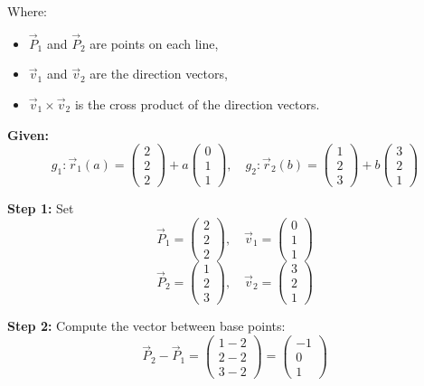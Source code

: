 Where:
\begin{itemize}
	\item $\vec{P}_1$ and $\vec{P}_2$ are points on each line,
	\item $\vec{v}_1$ and $\vec{v}_2$ are the direction vectors,
	\item $\vec{v}_1 \times \vec{v}_2$ is the cross product of the direction vectors.
\end{itemize}

\textbf{Given:}
\[
	g_1: \vec{r}_1(a) = \begin{pmatrix} 2 \\ 2 \\ 2 \end{pmatrix} + a \begin{pmatrix} 0 \\ 1 \\ 1 \end{pmatrix}, \quad
	g_2: \vec{r}_2(b) = \begin{pmatrix} 1 \\ 2 \\ 3 \end{pmatrix} + b \begin{pmatrix} 3 \\ 2 \\ 1 \end{pmatrix}
\]

\textbf{Step 1:} Set
\[
	\vec{P}_1 = \begin{pmatrix} 2 \\ 2 \\ 2 \end{pmatrix}, \quad \vec{v}_1 = \begin{pmatrix} 0 \\ 1 \\ 1 \end{pmatrix}
\]
\[
	\vec{P}_2 = \begin{pmatrix} 1 \\ 2 \\ 3 \end{pmatrix}, \quad \vec{v}_2 = \begin{pmatrix} 3 \\ 2 \\ 1 \end{pmatrix}
\]

\textbf{Step 2:} Compute the vector between base points:
\[
	\vec{P}_2 - \vec{P}_1 = \begin{pmatrix} 1 - 2 \\ 2 - 2 \\ 3 - 2 \end{pmatrix} = \begin{pmatrix} -1 \\ 0 \\ 1 \end{pmatrix}
\]

